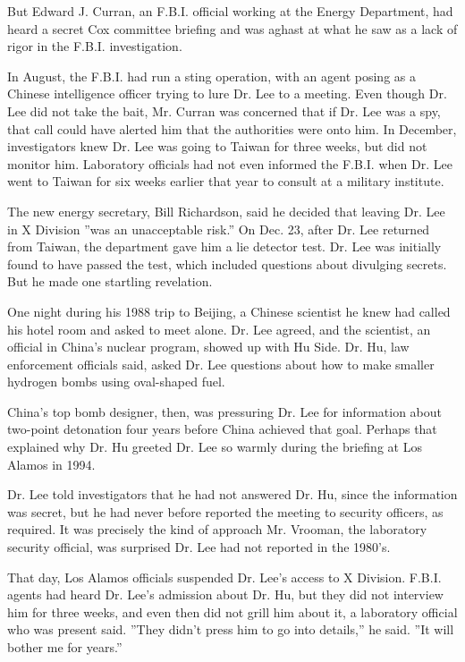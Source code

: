 But Edward J. Curran, an F.B.I. official working at the Energy
Department, had heard a secret Cox committee briefing and was aghast at
what he saw as a lack of rigor in the F.B.I. investigation.

In August, the F.B.I. had run a sting operation, with an agent posing as
a Chinese intelligence officer trying to lure Dr. Lee to a meeting. Even
though Dr. Lee did not take the bait, Mr. Curran was concerned that if
Dr. Lee was a spy, that call could have alerted him that the authorities
were onto him. In December, investigators knew Dr. Lee was going to
Taiwan for three weeks, but did not monitor him. Laboratory officials
had not even informed the F.B.I. when Dr. Lee went to Taiwan for six
weeks earlier that year to consult at a military institute.

The new energy secretary, Bill Richardson, said he decided that leaving
Dr. Lee in X Division ''was an unacceptable risk.'' On Dec. 23, after
Dr. Lee returned from Taiwan, the department gave him a lie detector
test. Dr. Lee was initially found to have passed the test, which
included questions about divulging secrets. But he made one startling
revelation.

One night during his 1988 trip to Beijing, a Chinese scientist he knew
had called his hotel room and asked to meet alone. Dr. Lee agreed, and
the scientist, an official in China's nuclear program, showed up with Hu
Side. Dr. Hu, law enforcement officials said, asked Dr. Lee questions
about how to make smaller hydrogen bombs using oval-shaped fuel.

China's top bomb designer, then, was pressuring Dr. Lee for information
about two-point detonation four years before China achieved that goal.
Perhaps that explained why Dr. Hu greeted Dr. Lee so warmly during the
briefing at Los Alamos in 1994.

Dr. Lee told investigators that he had not answered Dr. Hu, since the
information was secret, but he had never before reported the meeting to
security officers, as required. It was precisely the kind of approach
Mr. Vrooman, the laboratory security official, was surprised Dr. Lee had
not reported in the 1980's.

That day, Los Alamos officials suspended Dr. Lee's access to X Division.
F.B.I. agents had heard Dr. Lee's admission about Dr. Hu, but they did
not interview him for three weeks, and even then did not grill him about
it, a laboratory official who was present said. ''They didn't press him
to go into details,'' he said. ''It will bother me for years.''


